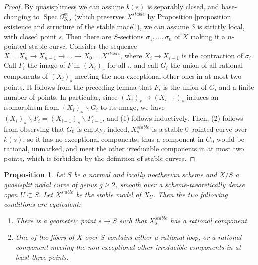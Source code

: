 \documentclass[a4paper,10pt,twoside]{article}
\newcommand{\ra}{\rightarrow}
\newcommand{\on}[1]{\operatorname{#1}}
\renewcommand{\O}{\mathcal{O}}
\DeclareMathOperator{\spec}{Spec}
\newtheorem{prop}[thm]{Proposition}
\theoremstyle{definition}
\theoremstyle{remark}
\renewcommand{\on}[1]{\operatorname{#1}}
\begin{document}
\begin{proof}
By quasisplitness we can assume $k(s)$ is separably closed, and base-changing to $\spec\O_{S,s}^{\on{et}}$ (which preserves $X^{stable}$ by Proposition \ref{proposition existence and structure of the stable model}), we can assume $S$ is strictly local, with closed point $s$. Then there are $S$-sections $\sigma_1,...,\sigma_n$ of $X$ making it a $n$-pointed stable curve. Consider the sequence $X=X_n\ra X_{n-1}\ra...\ra X_0=X^{stable}$, where $X_{i}\ra X_{i-1}$ is the contraction of $\sigma_i$. Call $F_i$ the image of $F$ in $(X_i)_s$ for all $i$, and call $G_i$ the union of all rational components of $(X_i)_s$ meeting the non-exceptional other ones in at most two points. It follows from the preceding lemma that $F_i$ is the union of $G_i$ and a finite number of points. In particular, since $(X_i)_s\ra (X_{i-1})_s$ induces an isomorphism from $(X_i)_s\backslash G_i$ to its image, we have $(X_i)_s\backslash F_i=(X_{i-1})_s\backslash F_{i-1}$, and (1) follows inductively. Then, (2) follows from observing that $G_0$ is empty: indeed, $X^{stable}_s$ is a stable $0$-pointed curve over $k(s)$, so it has no exceptional components, thus a component in $G_0$ would be rational, unmarked, and meet the other irreducible components in at most two points, which is forbidden by the definition of stable curves.
\end{proof}


\begin{prop}\label{proposition the stable model has no rational components}
Let $S$ be a normal and locally noetherian scheme and $X/S$ a quasisplit nodal curve of genus $g\geq 2$, smooth over a scheme-theoretically dense open $U\subset S$. Let $X^{stable}$ be the stable model of $X_U$. Then the two following conditions are equivalent:
\begin{enumerate}
\item There is a geometric point $s\ra S$ such that $X^{stable}_s$ has a rational component.
\item One of the fibers of $X$ over $S$ contains either a rational loop, or a rational component meeting the non-exceptional other irreducible components in at least three points.
\end{enumerate}

\end{prop}
\end{document}
